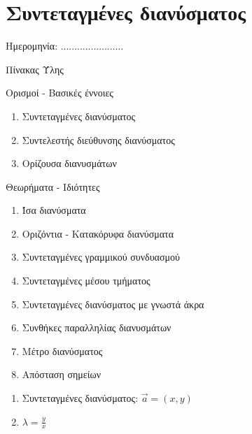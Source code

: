 \documentclass[internet]{frontisthrio}
\newcommand{\myitem}{\stepcounter{enumi}\item[\raisebox{0.5mm}{\faExclamationTriangle}\ \Large$\square$]}
\begin{document}
\section{Συντεταγμένες διανύσματος}
\begin{flushright}
\faCalendar* Ημερομηνία: .......................
\end{flushright}
\begin{mybox}[mysubtitle]{Πίνακας Ύλης}
\begin{tcbraster}[raster columns=2,raster equal height]
\begin{myleftbox}{Ορισμοί - Βασικές έννοιες\ \ \faBook}
\begin{enumerate}[itemsep=0mm]
\item Συντεταγμένες διανύσματος
\item Συντελεστής διεύθυνσης διανύσματος
\item Ορίζουσα διανυσμάτων
\end{enumerate}
\end{myleftbox}
\begin{myrightbox}{Θεωρήματα - Ιδιότητες\ \ \faTools}
\begin{enumerate}[itemsep=0mm]
\item Ίσα διανύσματα
\item Οριζόντια - Κατακόρυφα διανύσματα
\item Συντεταγμένες γραμμικού συνδυασμού
\item Συντεταγμένες μέσου τμήματος
\item Συντεταγμένες διανύσματος με γνωστά άκρα
\item Συνθήκες παραλληλίας διανυσμάτων
\item Μέτρο διανύσματος
\item Απόσταση σημείων
\end{enumerate}
\end{myrightbox}
\end{tcbraster}
\begin{multicols}{2}
\begin{todolist}[itemsep=0mm]
\myitem 
\end{todolist}
\end{multicols}
\begin{multicols}{2}
\begin{enumerate}[itemsep=0mm,leftmargin=5mm]
\item Συντεταγμένες διανύσματος: $\vec{a}=(x,y)$
\item $\lambda=\frac{y}{x}$

\end{enumerate}
\end{multicols}
\end{mybox}
\end{document}
